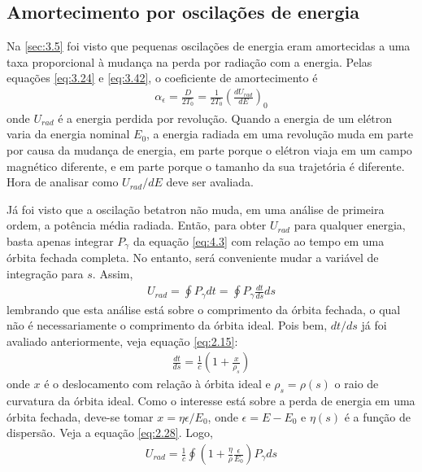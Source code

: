 \subsection{Amortecimento por oscilações de energia}
Na \autoref{sec:3.5} foi visto que pequenas oscilações de energia eram amortecidas a uma taxa proporcional à mudança na perda por radiação com a energia. Pelas equações \eqref{eq:3.24} e \eqref{eq:3.42}, o coeficiente de amortecimento é
\begin{align}
	\alpha_\epsilon = \frac{D}{2T_0} = \frac{1}{2T_0}\left(\frac{dU_{rad}}{dE}\right)_0
\end{align}
onde $U_{rad}$ é a energia perdida por revolução. Quando a energia de um elétron varia da energia nominal $E_0$, a energia radiada em uma revolução muda em parte por causa da mudança de energia, em parte porque o elétron viaja em um campo magnético diferente, e em parte porque o tamanho da sua trajetória é diferente. Hora de analisar como $U_{rad}/dE$ deve ser avaliada.

Já foi visto que a oscilação betatron não muda, em uma análise de primeira ordem, a potência média radiada. Então, para obter $U_{rad}$ para qualquer energia, basta apenas integrar $P_\gamma$ da equação \eqref{eq:4.3} com relação ao tempo em uma órbita fechada completa. No entanto, será conveniente mudar a variável de integração para $s$. Assim,
\begin{align}
	U_{rad} = \oint P_\gamma dt = \oint P_\gamma \frac{dt}{ds}ds
\end{align}
lembrando que esta análise está sobre o comprimento da órbita fechada, o qual não é necessariamente o comprimento da órbita ideal. Pois bem, $dt/ds$ já foi avaliado anteriormente, veja equação  \eqref{eq:2.15}:
\begin{align*}
	\frac{dt}{ds} = \frac{1}{c} \left(1+\frac{x}{\rho_s}\right)
\end{align*}
onde $x$ é o deslocamento com relação à órbita ideal e $\rho_s = \rho(s)$ o raio de curvatura da órbita ideal. Como o interesse está sobre a perda de energia em uma órbita fechada, deve-se tomar $x = \eta \epsilon/E_0$, onde $\epsilon = E-E_0$ e $\eta(s)$ é a função de dispersão. Veja a equação \eqref{eq:2.28}. Logo,
\begin{align}
	U_{rad} = \frac{1}{c} \oint \left(1+ \frac{\eta}{\rho}\frac{\epsilon}{E_0}\right)P_\gamma ds
\end{align}

